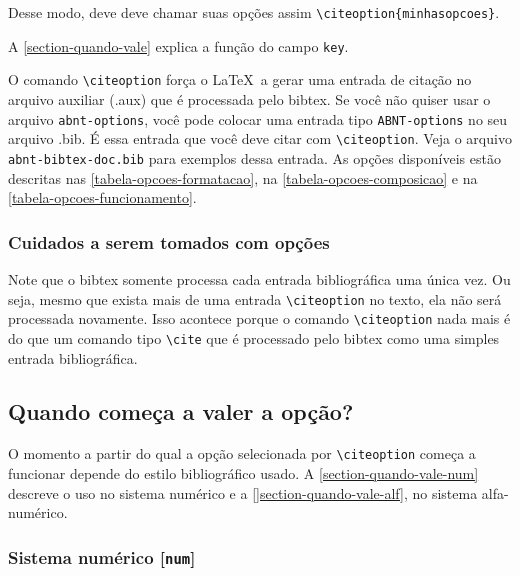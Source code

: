 \documentclass[a4paper]{ltxdoc}
\begin{document}
Desse modo, deve deve chamar suas opções assim \verb+\citeoption{minhasopcoes}+.

A \autoref{section-quando-vale} explica a função do campo {\tt key}.


O comando \verb+\citeoption+ força o \LaTeX\ a gerar uma entrada de citação no
arquivo auxiliar (.aux) que é processada pelo \textsf{bibtex}. Se você não
quiser usar o arquivo {\tt abnt-options}, você pode colocar uma entrada tipo
{\tt ABNT-options} no seu arquivo .bib. É essa entrada que você deve citar com
\verb+\citeoption+. Veja o arquivo {\tt abnt-bibtex-doc.bib} para exemplos dessa
entrada. As opções disponíveis estão descritas nas
\autoref{tabela-opcoes-formatacao}, na \autoref{tabela-opcoes-composicao} e na
\autoref{tabela-opcoes-funcionamento}.

\subsubsection{Cuidados a serem tomados com opções}

Note que o \textsf{bibtex} somente processa cada entrada bibliográfica uma única
vez. Ou seja, mesmo que exista mais de uma entrada \verb+\citeoption+ no texto,
ela não será processada novamente. Isso acontece porque o comando
\verb+\citeoption+ nada mais é do que um comando tipo \verb+\cite+ que é
processado pelo \textsf{bibtex} como uma simples entrada bibliográfica.

\subsection{Quando começa a valer a opção?}
\label{section-quando-vale}

O momento a partir do qual a opção selecionada por \verb+\citeoption+
começa a funcionar depende do estilo bibliográfico usado. A
\autoref{section-quando-vale-num} descreve o uso no sistema numérico e a
\autoref{]section-quando-vale-alf}, no sistema alfa-numérico.

\subsubsection{Sistema numérico [{\tt num}]}\label{section-quando-vale-num}
\end{document}
